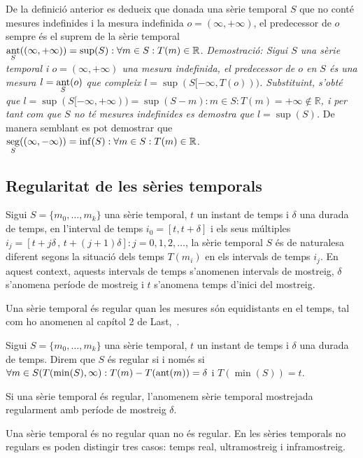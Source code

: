 De la definició anterior es dedueix que donada una sèrie temporal $S$
que no conté mesures indefinides i la mesura indefinida
$o=(\infty,+\infty)$, el predecessor de $o$ sempre és el suprem de la
sèrie temporal $\operatorname*{ant}\limits_S( (\infty,+\infty) ) = \sup(S): \forall
m\in S: T(m)\in\mathbb{R}$.  %
\emph{Demostració: Sigui $S$ una sèrie temporal i $o=(\infty,+\infty)$
  una mesura indefinida, el predecessor de $o$ en $S$ és una mesura
  $l=\operatorname*{ant}\limits_S(o)$ que compleix
  $l=\sup(S[-\infty,T(o)))$. Substituint, s'obté que
  $l=\sup(S[-\infty,+\infty))=\sup(S-m):m\in S:T(m)=+\infty \notin
  \mathbb{R}$, i per tant com que $S$ no té mesures indefinides es
  demostra que $l=\sup(S)$.  } De manera semblant es pot demostrar que
$\operatorname*{seg}\limits_S( (\infty,-\infty) ) = \inf(S): \forall m\in S:
T(m)\in\mathbb{R}$.




\subsection{Regularitat de les sèries temporals} 

Sigui $S=\{m_0,\ldots,m_k\}$ una sèrie temporal, $t$ un instant de temps i $\delta$ una durada de temps, en l'interval de temps $i_0=[t,t+\delta]$ i els seus múltiples $i_j=[t+j\delta \,,\, t+(j+1)\delta]: j=0,1,2,\ldots$,  
la sèrie temporal $S$ és de naturalesa diferent segons la situació dels temps $T(m_i)$ en els intervals de temps $i_j$.
En aquest context, aquests intervals de temps s'anomenen intervals de mostreig, $\delta$ s'anomena període de mostreig i $t$ s'anomena temps d'inici del mostreig.

Una sèrie temporal és regular quan les mesures són equidistants en el temps, tal com ho anomenen al capítol 2 de Last,~\cite{last}.

\begin{definition}
  Sigui $S=\{m_0,\ldots,m_k\}$ una sèrie temporal, $t$ un instant de
  temps i $\delta$ una durada de temps. Direm que $S$ és regular si i
  només si $\forall m \in S(T(\min(S),\infty):T(m) - T(\operatorname*{ant}(m)) = \delta$ i
  $T(\min(S))=t$. 
\end{definition}

Si una sèrie temporal és regular, l'anomenem  sèrie temporal mostrejada
regularment amb període de mostreig $\delta$.


Una sèrie temporal és no regular quan no és regular. 
En les sèries temporals no regulars es poden distingir tres casos: temps real, ultramostreig i inframostreig.

